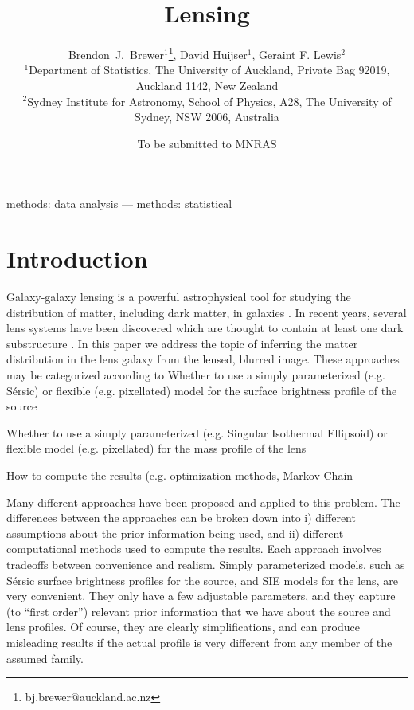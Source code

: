 \documentclass[useAMS,usenatbib]{mn2e}
\title[]
{Lensing}
\author[Brewer, Huijser and Lewis]{%
  Brendon~J.~Brewer$^{1}$\thanks{bj.brewer@auckland.ac.nz},
  David Huijser$^{1}$,
  Geraint F. Lewis$^2$
  \medskip\\
  $^1$Department of Statistics, The University of Auckland, Private Bag 92019, Auckland 1142, New Zealand\\
  $^2$Sydney Institute for Astronomy, School of Physics, A28,
  The University of Sydney, NSW 2006, Australia}
\begin{document}
             
\date{To be submitted to MNRAS}
             
\maketitle

\label{firstpage}

\begin{abstract}

\end{abstract}


\begin{keywords}
methods: data analysis --- methods: statistical
\end{keywords}

\section{Introduction}
Galaxy-galaxy lensing is a powerful astrophysical tool for studying
the distribution of matter, including dark matter, in galaxies
\citep{treu}. In recent years, several lens systems have been discovered which
are thought to contain at least one dark substructure
\citep{vegetti1, vegetti2, vegetti3}. In this paper we address the topic of
inferring the matter distribution in the lens galaxy from the lensed,
blurred image. These approaches may be categorized according to
Whether to use a simply parameterized (e.g. Sérsic)
or flexible (e.g. pixellated) model for the surface brightness profile of the source
\item Whether to use a simply parameterized (e.g. Singular Isothermal Ellipsoid)
or flexible model (e.g. pixellated) for the mass profile of the lens
\item How to compute the results (e.g. optimization methods, Markov Chain

Many different approaches have been proposed and applied to
this problem. The differences between the approaches can be broken down into
i) different assumptions about the prior information being used, and ii)
different computational methods used to compute the results.
Each approach involves tradeoffs between convenience and realism.
Simply parameterized models, such as Sérsic surface
brightness profiles for the source, and SIE models for the lens, are very
convenient. They only have a few adjustable parameters, and they capture
(to ``first order'') relevant prior information that we have about the
source and lens profiles. Of course, they are clearly simplifications,
and can produce misleading results if the actual profile is very different
from any member of the assumed family.
\end{document}
